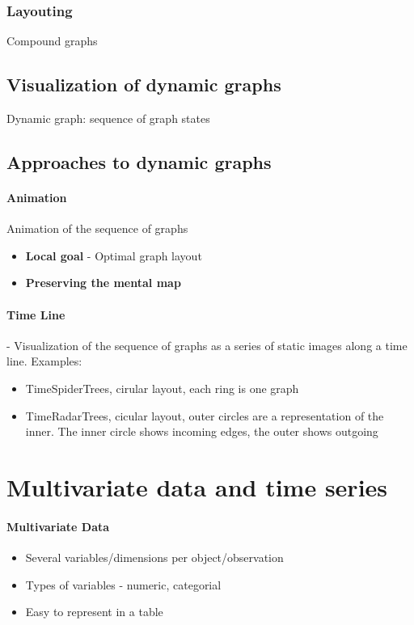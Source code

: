 \documentclass[10pt,a4paper]{article}
\begin{document}
	\subsubsection*{Layouting}
		Compound graphs

	\subsection{Visualization of dynamic graphs}
		Dynamic graph: sequence of graph states
		
		\subsection{Approaches to dynamic graphs}
		
		\paragraph{Animation} Animation of the sequence of graphs
		\begin{itemize}
			\item \textbf{Local goal} - Optimal graph layout
			\item \textbf{Preserving the mental map}
		\end{itemize}
		
		\paragraph{Time Line} - Visualization of the sequence of graphs as a series of
		static images along a time line. Examples:
		
		\begin{itemize} 
			\item TimeSpiderTrees, cirular layout, each ring is one graph
			\item TimeRadarTrees, cicular layout, outer circles are a representation of the inner. The inner circle shows incoming edges, the outer shows outgoing
		\end{itemize}
		
\section{Multivariate data and time series}
	\paragraph{Multivariate Data}
		\begin{itemize}
			\item Several variables/dimensions per
			object/observation
			\item Types of variables - numeric, categorial
			\item Easy to represent in a table
		\end{itemize}
	
\end{document}
